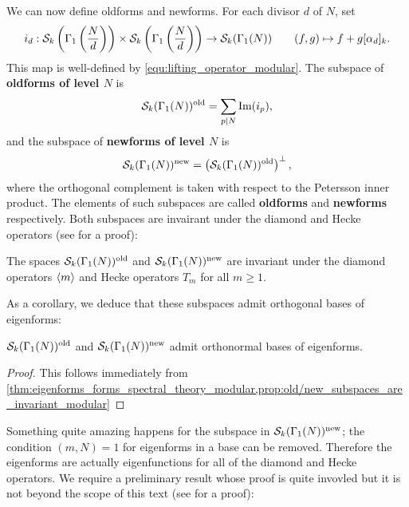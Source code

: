       We can now define oldforms and newforms. For each divisor $d$ of $N$, set
      \[
        i_{d}:\mathcal{S}_{k}\left(\Gamma_{1}\left(\frac{N}{d}\right)\right)\times\mathcal{S}_{k}\left(\Gamma_{1}\left(\frac{N}{d}\right)\right) \to \mathcal{S}_{k}(\Gamma_{1}(N)) \qquad (f,g) \mapsto f+g[\alpha_{d}]_{k}.
      \]
      This map is well-defined by \cref{equ:lifting_operator_modular}. The subspace of \textbf{oldforms of level $N$} is
      \[
        \mathcal{S}_{k}(\Gamma_{1}(N))^{\mathrm{old}} = \sum_{p \mid N}\mathrm{Im}(i_{p}),
      \]
      and the subspace of \textbf{newforms of level $N$} is
      \[
        \mathcal{S}_{k}(\Gamma_{1}(N))^{\mathrm{new}} = \left(\mathcal{S}_{k}(\Gamma_{1}(N))^{\mathrm{old}} \right)^{\perp},
      \]
      where the orthogonal complement is taken with respect to the Petersson inner product. The elements of such subspaces are called \textbf{oldforms} and \textbf{newforms} respectively. Both subspaces are invairant under the diamond and Hecke operators (see \cite{diamond2005first} for a proof):

      \begin{proposition}\label{prop:old/new_subspaces_are_invariant_modular}
        The spaces $\mathcal{S}_{k}(\Gamma_{1}(N))^{\mathrm{old}}$ and $\mathcal{S}_{k}(\Gamma_{1}(N))^{\mathrm{new}}$ are invariant under the diamond operators $\langle m\rangle$ and Hecke operators $T_{m}$ for all $m \ge 1$.
      \end{proposition}

      As a corollary, we deduce that these subspaces admit orthogonal bases of eigenforms:

      \begin{corollary}\label{cor:old/new_eigenbasis_modular}
        $\mathcal{S}_{k}(\Gamma_{1}(N))^{\mathrm{old}}$ and $\mathcal{S}_{k}(\Gamma_{1}(N))^{\mathrm{new}}$ admit orthonormal bases of eigenforms.
      \end{corollary}
      \begin{proof}
        This follows immediately from \cref{thm:eigenforms_forms_spectral_theory_modular,prop:old/new_subspaces_are_invariant_modular}
      \end{proof}

      Something quite amazing happens for the subspace in $\mathcal{S}_{k}(\Gamma_{1}(N))^{\mathrm{new}}$; the condition $(m,N) = 1$ for eigenforms in a base can be removed. Therefore the eigenforms are actually eigenfunctions for all of the diamond and Hecke operators. We require a preliminary result whose proof is quite invovled but it is not beyond the scope of this text (see \cite{diamond2005first} for a proof):

